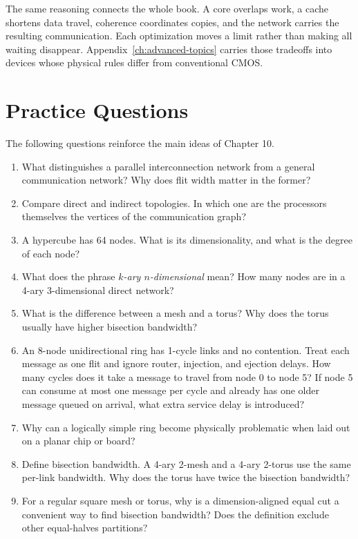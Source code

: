 The same reasoning connects the whole book.
A core overlaps work, a cache shortens data travel, coherence coordinates copies, and the network carries the resulting communication.
Each optimization moves a limit rather than making all waiting disappear.
Appendix~\ref{ch:advanced-topics} carries those tradeoffs into devices whose physical rules differ from conventional CMOS.


\section{Practice Questions}\label{sec:ch10-practice}
The following questions reinforce the main ideas of Chapter 10.
\begin{enumerate}
    \item What distinguishes a parallel interconnection network from a general communication network?
    Why does flit width matter in the former?
    \item Compare direct and indirect topologies.
    In which one are the processors themselves the vertices of the communication graph?
    \item A hypercube has 64 nodes.
    What is its dimensionality, and what is the degree of each node?
    \item What does the phrase \textit{$k$-ary $n$-dimensional} mean?
    How many nodes are in a 4-ary 3-dimensional direct network?
    \item What is the difference between a mesh and a torus?
    Why does the torus usually have higher bisection bandwidth?
    \item An 8-node unidirectional ring has 1-cycle links and no contention.
    Treat each message as one flit and ignore router, injection, and ejection delays.
    How many cycles does it take a message to travel from node 0 to node 5?
    If node 5 can consume at most one message per cycle and already has one older message queued on arrival, what extra service delay is introduced?
    \item Why can a logically simple ring become physically problematic when laid out on a planar chip or board?
    \item Define bisection bandwidth.
    A 4-ary 2-mesh and a 4-ary 2-torus use the same per-link bandwidth.
    Why does the torus have twice the bisection bandwidth?
    \item For a regular square mesh or torus, why is a dimension-aligned equal cut a convenient way to find bisection bandwidth?
    Does the definition exclude other equal-halves partitions?

\end{enumerate}
